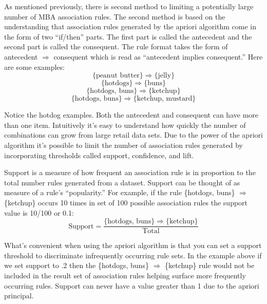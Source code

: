 \documentclass[../article.tex, 12pt]{subfiles}
\begin{document}
\begin{multicols*}{2}
\par
As mentioned previously, there is second method to limiting a potentially large number of MBA association rules. The second method is based on the understanding that association rules generated by the apriori algorithm come in the form of two ``if/then'' parts. The first part is called the antecedent and the second part is called the consequent. The rule format takes the form of {antecedent} $\Rightarrow$ {consequent} which is read as ``antecedent implies consequent.'' Here are some examples:
\begin{equation*}
\{\text{peanut butter}\} \Rightarrow \{\text{jelly}\}
\end{equation*}
\begin{equation*}
\{\text{hotdogs}\} \Rightarrow \{\text{buns}\}
\end{equation*}
\begin{equation*}
\{\text{hotdogs, buns}\} \Rightarrow \{\text{ketchup}\}
\end{equation*}
\begin{equation*}
\{\text{hotdogs, buns}\} \Rightarrow \{\text{ketchup, mustard}\}
\end{equation*}

Notice the hotdog examples. Both the antecedent and consequent can have more than one item. Intuitively it's easy to understand how quickly the number of combinations can grow from large retail data sets. Due to the power of the apriori algorithm it's possible to limit the number of association rules generated by incorporating thresholds called support, confidence, and lift.

\par
Support is a measure of how frequent an association rule is in proportion to the total number rules generated from a dataset. Support can be thought of as measure of a rule's ``popularity.'' For example, if the rule \{hotdogs, buns\} $\Rightarrow$ \{ketchup\} occurs 10 times in set of 100 possible association rules the support value is 10/100 or 0.1:
\begin{equation*}
\text{Support} = \frac{\{\text{hotdogs, buns}\} \Rightarrow \{\text{ketchup}\}}{\text{Total}}
\end{equation*}

What's convenient when using the apriori algorithm is that you can set a support threshold to discriminate infrequently occurring rule sets. In the example above if we set support to .2 then the \{hotdogs, buns\} $\Rightarrow$ \{ketchup\} rule would not be included in the result set of association rules helping surface more frequently occurring rules. Support can never have a value greater than 1 due to the apriori principal.


\end{multicols*}
\end{document}
